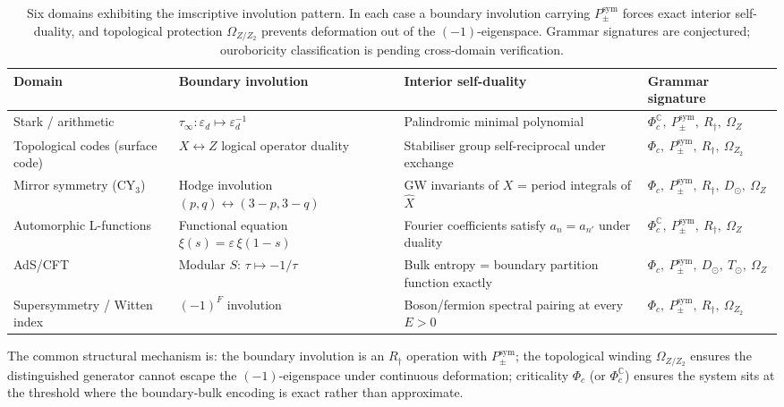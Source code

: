 \documentclass[12pt]{article}
\theoremstyle{plain}
\theoremstyle{definition}
\theoremstyle{remark}
\newcommand{\tauinf}{\tau_\infty}
\newcommand{\epsd}{\varepsilon_d}
\begin{document}
\begin{table}[h]
\centering
\small
\renewcommand{\arraystretch}{1.35}
\begin{tabular}{@{}p{3.0cm}p{3.2cm}p{3.2cm}p{3.6cm}@{}}
\toprule
\textbf{Domain} & \textbf{Boundary involution} & \textbf{Interior self-duality}
  & \textbf{Grammar signature} \\
\midrule
Stark / arithmetic
  & $\tauinf: \epsd \mapsto \epsd^{-1}$
  & Palindromic minimal polynomial
  & $\Phi_c^\mathbb{C},\ P_{\pm}^{\text{sym}},\ R_\dagger,\ \Omega_Z$ \\

Topological codes (surface code)
  & $X \leftrightarrow Z$ logical operator duality
  & Stabiliser group self-reciprocal under exchange
  & $\Phi_c,\ P_{\pm}^{\text{sym}},\ R_\dagger,\ \Omega_{Z_2}$ \\

Mirror symmetry (CY$_3$)
  & Hodge involution $(p,q) \leftrightarrow (3{-}p, 3{-}q)$
  & GW invariants of $X$ = period integrals of $\hat{X}$
  & $\Phi_c,\ P_{\pm}^{\text{sym}},\ R_\dagger,\ D_\odot,\ \Omega_Z$ \\

Automorphic L-functions
  & Functional equation $\xi(s) = \varepsilon\,\xi(1{-}s)$
  & Fourier coefficients satisfy $a_n = a_{n'}$ under duality
  & $\Phi_c^\mathbb{C},\ P_{\pm}^{\text{sym}},\ R_\dagger,\ \Omega_Z$ \\

AdS/CFT
  & Modular $S$: $\tau \mapsto -1/\tau$
  & Bulk entropy = boundary partition function exactly
  & $\Phi_c,\ P_{\pm}^{\text{sym}},\ D_\odot,\ T_\odot,\ \Omega_Z$ \\

Supersymmetry / Witten index
  & $(-1)^F$ involution
  & Boson/fermion spectral pairing at every $E > 0$
  & $\Phi_c,\ P_{\pm}^{\text{sym}},\ R_\dagger,\ \Omega_{Z_2}$ \\
\bottomrule
\end{tabular}
\caption{Six domains exhibiting the imscriptive involution pattern. In each case a boundary
involution carrying $P_{\pm}^{\text{sym}}$ forces exact interior self-duality, and topological
protection $\Omega_{Z/Z_2}$ prevents deformation out of the $(-1)$-eigenspace. Grammar
signatures are conjectured; ouroboricity classification is pending cross-domain verification.}
\label{tab:analogs}
\end{table}

The common structural mechanism is: the boundary involution is an $R_\dagger$ operation with
$P_{\pm}^{\text{sym}}$; the topological winding $\Omega_{Z/Z_2}$ ensures the distinguished
generator cannot escape the $(-1)$-eigenspace under continuous deformation; criticality
$\Phi_c$ (or $\Phi_c^\mathbb{C}$) ensures the system sits at the threshold where the
boundary-bulk encoding is exact rather than approximate.
\end{document}
